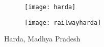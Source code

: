 \begin{figure}[ht!]
	\begin{subfigure}{.5\textwidth}
	  	\centering
	  	\texttt{[image: harda]}
	  	\label{fig:sub1}
	\end{subfigure}%
	\begin{subfigure}{.5\textwidth}
	  	\centering
	  	\texttt{[image: railwayharda]}
	  	\label{fig:sub2}
	\end{subfigure}
	\caption{Harda, Madhya Pradesh}
	\label{figstart}
\end{figure}


